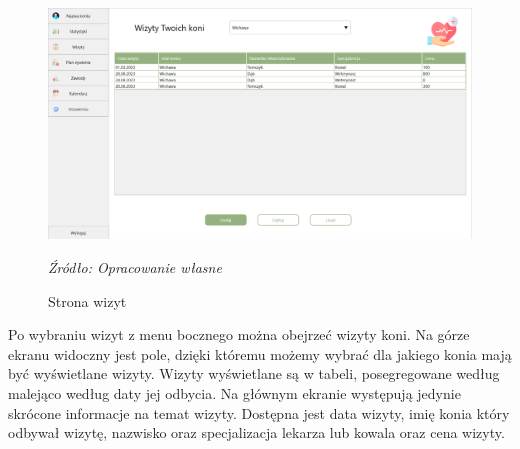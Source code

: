 \documentclass[12pt,oneside]{report}
\begin{document}
\begin{figure}[H]
\centering
\includegraphics[scale=0.4]{Wizyty}
\caption{Strona wizyt}
\textit{Źródło: Opracowanie własne}
\label{Wizyty}
\end{figure}
Po wybraniu wizyt z menu bocznego można obejrzeć wizyty koni. Na górze ekranu widoczny jest pole, dzięki któremu możemy wybrać dla jakiego konia mają być wyświetlane wizyty. Wizyty wyświetlane są w tabeli, posegregowane według malejąco według daty jej odbycia. Na głównym ekranie występują jedynie skrócone informacje na temat wizyty. Dostępna jest data wizyty, imię konia który odbywał wizytę, nazwisko oraz specjalizacja lekarza lub kowala oraz cena wizyty. 
\end{document}
